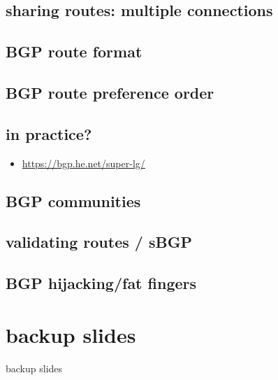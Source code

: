 \subsection{sharing routes: multiple connections}


\subsection{BGP route format}


\subsection{BGP route preference order}

\subsection{in practice?}
\begin{frame}{}
    \begin{itemize}
    \item \url{https://bgp.he.net/super-lg/}
    \end{itemize}
\end{frame}

\subsection{BGP communities}


\subsection{validating routes / sBGP}

\subsection{BGP hijacking/fat fingers}


\section{backup slides}
\begin{frame}{backup slides}
\end{frame}



